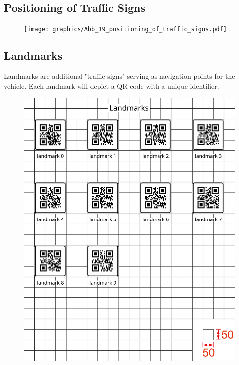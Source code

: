 \subsection{Positioning of Traffic Signs}
\begin{figure}[H]
	\begin{center}
		\centering\texttt{[image: graphics/Abb\_19\_positioning\_of\_traffic\_signs.pdf]}
	\end{center}
\end{figure}

\begin{highlight}[Green]
\section{Landmarks}
\label{fig_landmarks}

Landmarks are additional "traffic signs" serving as navigation points for the
vehicle. Each landmark will depict a QR code with a unique identifier.

\begin{figure}[H]
	\begin{center}
		\centering\includegraphics[]{graphics/Abb_24_landmarks.pdf}
	\end{center}
\end{figure}
\end{highlight}

